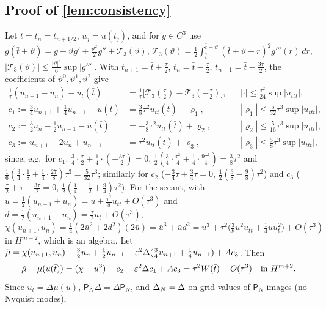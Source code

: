 \subsection{Proof of \cref{lem:consistency}}\label{app:consistency}
Let $\bar t=\bar t_n=t_{n+1/2}$, $u_j=u(t_j)$, and for $g\in C^3$ use $g(\bar t+\vartheta)=g+\vartheta g'+\frac{\vartheta^2}2g''+\mathcal T_3(\vartheta)$, $\mathcal T_3(\vartheta)=\frac12\int_{\bar t}^{\bar t+\vartheta}(\bar t+\vartheta-r)^2g'''(r)\,dr$, $|\mathcal T_3(\vartheta)|\le\frac{|\vartheta|^3}6\sup|g'''|$. With $t_{n+1}=\bar t+\frac\tau2$, $t_n=\bar t-\frac\tau2$, $t_{n-1}=\bar t-\frac{3\tau}2$, the coefficients of $\vartheta^0,\vartheta^1,\vartheta^2$ give
\begin{align*}
\tfrac1\tau(u_{n+1}-u_n)-u_t(\bar t)&=\tfrac1\tau\big[\mathcal T_3(\tfrac\tau2)-\mathcal T_3(-\tfrac\tau2)\big],&&|\cdot|\le\tfrac{\tau^2}{24}\sup|u_{ttt}|,\\
c_1:=\tfrac34u_{n+1}+\tfrac14u_{n-1}-u(\bar t)&=\tfrac38\tau^2u_{tt}(\bar t)+\varrho_1,&&|\varrho_1|\le\tfrac5{32}\tau^3\sup|u_{ttt}|,\\
c_2:=\tfrac32u_n-\tfrac12u_{n-1}-u(\bar t)&=-\tfrac38\tau^2u_{tt}(\bar t)+\varrho_2,&&|\varrho_2|\le\tfrac5{16}\tau^3\sup|u_{ttt}|,\\
c_3:=u_{n+1}-2u_n+u_{n-1}&=\tau^2u_{tt}(\bar t)+\varrho_3,&&|\varrho_3|\le\tfrac58\tau^3\sup|u_{ttt}|,
\end{align*}
since, e.g.\ for $c_1$: $\frac34\cdot\frac\tau2+\frac14\cdot(-\frac{3\tau}2)=0$, $\frac12(\frac34\cdot\frac{\tau^2}4+\frac14\cdot\frac{9\tau^2}4)=\frac38\tau^2$ and $\frac16(\frac34\cdot\frac18+\frac14\cdot\frac{27}8)\tau^3=\frac5{32}\tau^3$; similarly for $c_2$ ($-\frac34\tau+\frac34\tau=0$, $\frac12(\frac38-\frac98)\tau^2$) and $c_3$ ($\frac\tau2+\tau-\frac{3\tau}2=0$, $\frac12(\frac14-\frac12+\frac94)\tau^2$). For the secant, with $\bar u=\frac12(u_{n+1}+u_n)=u+\frac{\tau^2}8u_{tt}+O(\tau^3)$ and $d=\frac12(u_{n+1}-u_n)=\frac\tau2u_t+O(\tau^3)$,
\[
\chi(u_{n+1},u_n)=\tfrac14(2\bar u^2+2d^2)(2\bar u)=\bar u^3+\bar ud^2=u^3+\tau^2\big(\tfrac38u^2u_{tt}+\tfrac14uu_t^2\big)+O(\tau^3)
\]
in $H^{m+2}$, which is an algebra. Let $\tilde\mu=\chi(u_{n+1},u_n)-\frac32u_n+\frac12u_{n-1}-\varepsilon^2\Delta(\frac34u_{n+1}+\frac14u_{n-1})+Ac_3$. Then
\begin{equation}\label{eq:mutilde}
\tilde\mu-\mu(u(\bar t))=(\chi-u^3)-c_2-\varepsilon^2\Delta c_1+Ac_3=\tau^2W(\bar t)+O(\tau^3)\quad\text{in }H^{m+2}.
\end{equation}
Since $u_t=\Delta\mu(u)$, $\mathsf P_N\Delta=\Delta\mathsf P_N$, and $\Delta_N=\Delta$ on grid values of $\mathsf P_N$-images (no Nyquist modes),
